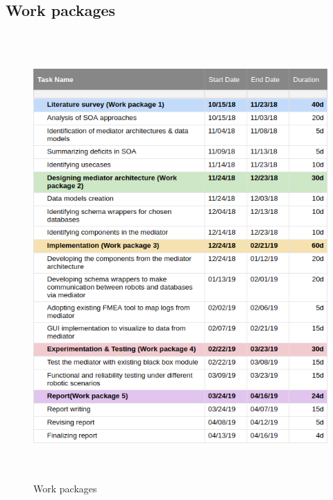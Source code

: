 \documentclass[12pt]{article}
\begin{document}
\subsection{Work packages}
\begin{figure}[h!]
  \includegraphics[width=\linewidth,height=17cm]{wp_v1.png}
  \caption{Work packages}
  \label{fig:work_packages}
\end{figure}
\end{document}

